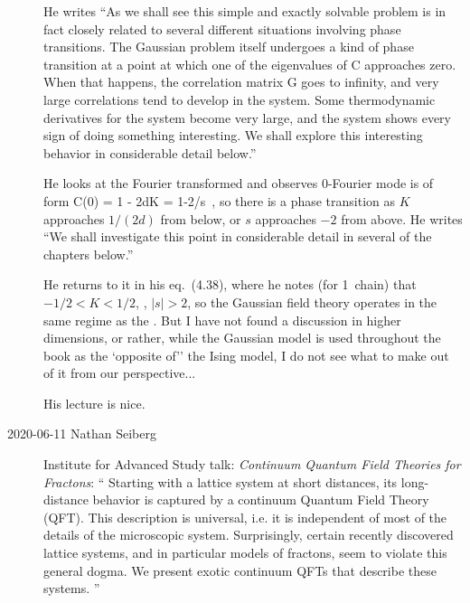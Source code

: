 \begin{description}
{He writes
``As we shall see this simple and exactly solvable problem is in fact
closely related to several different situations involving phase
transitions. The Gaussian problem itself undergoes a kind of phase
transition at a point at which one of the eigenvalues of C approaches
zero. When that happens, the correlation matrix G goes to infinity, and
very large correlations tend to develop in the system. Some thermodynamic
derivatives for the system become very large, and the system shows every
sign of doing something interesting. We shall explore this interesting
behavior in considerable detail below.''

He looks at the Fourier transformed {\jMorb} and observes 0-Fourier mode is
of form
\beq
C(0) = 1 - 2dK = 1-2/s
\,,
so there is a phase transition as $K$ approaches $1/(2d)$ from below, or
${s}$ approaches $-2$ from above. He writes ``We shall investigate this
point in considerable detail in several of the chapters below.''

He returns to it in his eq.~(4.38), where he notes (for 1\dmn\ chain)
that $-1/2<K<1/2$, \ie, $|{s}|>2$, so the Gaussian field theory operates
in the same regime as the \catlatt. But I have not found a discussion in
higher dimensions, or rather, while the Gaussian model is used throughout
the book as the `opposite of'' the Ising model, I do not see what to make
out of it from our perspective...

His lecture
{is nice}.
        }


  \item[2020-06-11 Nathan Seiberg]
Institute for Advanced Study talk:
{\em Continuum Quantum Field Theories for Fractons}:
``
Starting with a lattice system at short distances, its long-distance
behavior is captured by a continuum Quantum Field Theory (QFT). This
description is universal, i.e. it is independent of most of the details
of the microscopic system. Surprisingly, certain recently discovered
lattice systems, and in particular models of fractons, seem to violate
this general dogma. We present exotic continuum QFTs that describe these
systems.
''


\end{description}
